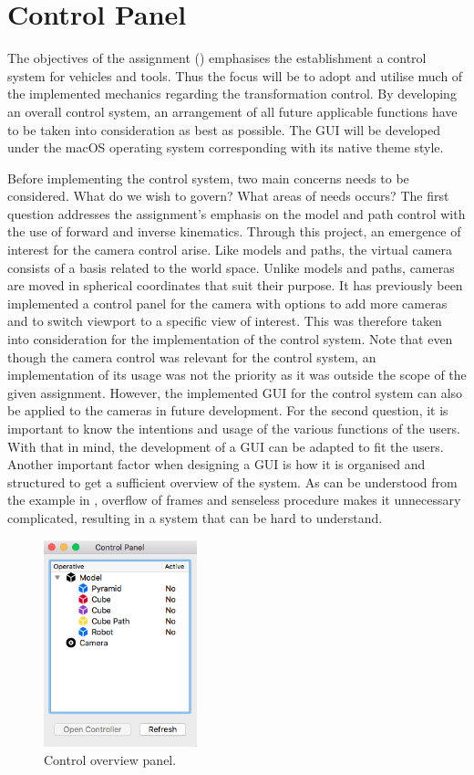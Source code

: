 \section{Control Panel}

The objectives of the assignment () emphasises the establishment a control system for vehicles and tools. Thus the focus will be to adopt and utilise much of the implemented mechanics regarding the transformation control. By developing an overall control system, an arrangement of all future applicable functions have to be taken into consideration as best as possible. The GUI will be developed under the macOS operating system corresponding with its native theme style.

Before implementing the control system, two main concerns needs to be considered. What do we wish to govern? What areas of needs occurs? The first question addresses the assignment's emphasis on the model and path control with the use of forward and inverse kinematics. Through this project, an emergence of interest for the camera control arise. Like models and paths, the virtual camera consists of a basis related to the world space. Unlike models and paths, cameras are moved in spherical coordinates that suit their purpose. It has previously been implemented a control panel for the camera with options to add more cameras and to switch viewport to a specific view of interest. This was therefore taken into consideration for the implementation of the control system. Note that even though the camera control was relevant for the control system, an implementation of its usage was not the priority as it was outside the scope of the given assignment. However, the implemented GUI for the control system can also be applied to the cameras in future development. For the second question, it is important to know the intentions and usage of the various functions of the users. With that in mind, the development of a GUI can be adapted to fit the users. Another important factor when designing a GUI is how it is organised and structured to get a sufficient overview of the system. As can be understood from the example in , overflow of frames and senseless procedure makes it unnecessary complicated, resulting in a system that can be hard to understand.

\begin{figure}[ht]
    \centering
    \includegraphics[height=6cm]{images/control_overview.png}
    \caption[Control overview panel]{Control overview panel.}
    \label{fig:ctroverview}
\end{figure}


